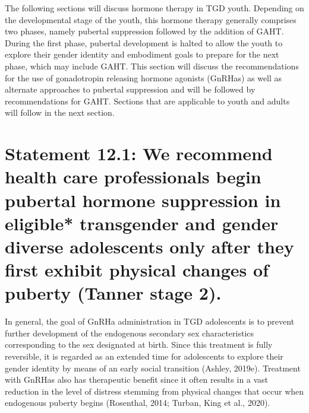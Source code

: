 \documentclass[
]{book}
\begin{document}
The following sections will discuss hormone therapy in TGD youth. Depending on the developmental stage of the youth, this hormone therapy
generally comprises two phases, namely pubertal
suppression followed by the addition of GAHT.
During the first phase, pubertal development is
halted to allow the youth to explore their gender
identity and embodiment goals to prepare for the
next phase, which may include GAHT. This section
will discuss the recommendations for the use of
gonadotropin releasing hormone agonists (GnRHas)
as well as alternate approaches to pubertal suppression and will be followed by recommendations for
GAHT. Sections that are applicable to youth and
adults will follow in the next section.

\hypertarget{statement-12.1-we-recommend-health-care-professionals-begin-pubertal-hormone-suppression-in-eligible-transgender-and-gender-diverse-adolescents-only-after-they-first-exhibit-physical-changes-of-puberty-tanner-stage-2.}{%
\section*{Statement 12.1: We recommend health care professionals begin pubertal hormone suppression in eligible* transgender and gender diverse adolescents only after they first exhibit physical changes of puberty (Tanner stage 2).}\label{statement-12.1-we-recommend-health-care-professionals-begin-pubertal-hormone-suppression-in-eligible-transgender-and-gender-diverse-adolescents-only-after-they-first-exhibit-physical-changes-of-puberty-tanner-stage-2.}}

In general, the goal of GnRHa administration
in TGD adolescents is to prevent further development of the endogenous secondary sex characteristics corresponding to the sex designated at
birth. Since this treatment is fully reversible, it
is regarded as an extended time for adolescents
to explore their gender identity by means of an
early social transition (Ashley, 2019e). Treatment
with GnRHas also has therapeutic benefit since
it often results in a vast reduction in the level
of distress stemming from physical changes that
occur when endogenous puberty begins
(Rosenthal, 2014; Turban, King et al., 2020).
\end{document}
